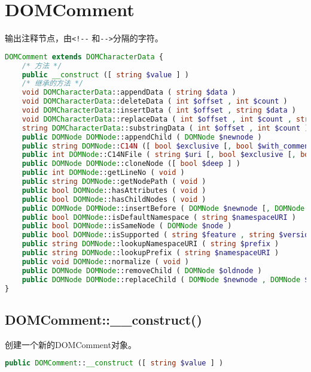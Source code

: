\section{DOMComment}

输出注释节点，由\texttt{<!-\/-} 和\texttt{-\/->}分隔的字符。



\begin{lstlisting}[language=PHP]
DOMComment extends DOMCharacterData {
    /* 方法 */
    public __construct ([ string $value ] )
    /* 继承的方法 */
    void DOMCharacterData::appendData ( string $data )
    void DOMCharacterData::deleteData ( int $offset , int $count )
    void DOMCharacterData::insertData ( int $offset , string $data )
    void DOMCharacterData::replaceData ( int $offset , int $count , string $data )
    string DOMCharacterData::substringData ( int $offset , int $count )
    public DOMNode DOMNode::appendChild ( DOMNode $newnode )
    public string DOMNode::C14N ([ bool $exclusive [, bool $with_comments [, array $xpath [, array $ns_prefixes ]]]] )
    public int DOMNode::C14NFile ( string $uri [, bool $exclusive [, bool $with_comments [, array $xpath [, array $ns_prefixes ]]]] )
    public DOMNode DOMNode::cloneNode ([ bool $deep ] )
    public int DOMNode::getLineNo ( void )
    public string DOMNode::getNodePath ( void )
    public bool DOMNode::hasAttributes ( void )
    public bool DOMNode::hasChildNodes ( void )
    public DOMNode DOMNode::insertBefore ( DOMNode $newnode [, DOMNode $refnode ] )
    public bool DOMNode::isDefaultNamespace ( string $namespaceURI )
    public bool DOMNode::isSameNode ( DOMNode $node )
    public bool DOMNode::isSupported ( string $feature , string $version )
    public string DOMNode::lookupNamespaceURI ( string $prefix )
    public string DOMNode::lookupPrefix ( string $namespaceURI )
    public void DOMNode::normalize ( void )
    public DOMNode DOMNode::removeChild ( DOMNode $oldnode )
    public DOMNode DOMNode::replaceChild ( DOMNode $newnode , DOMNode $oldnode )
}
\end{lstlisting}

\subsection{DOMComment::\_\_construct()}

创建一个新的DOMComment对象。

\begin{lstlisting}[language=PHP]
public DOMComment::__construct ([ string $value ] )
\end{lstlisting}

